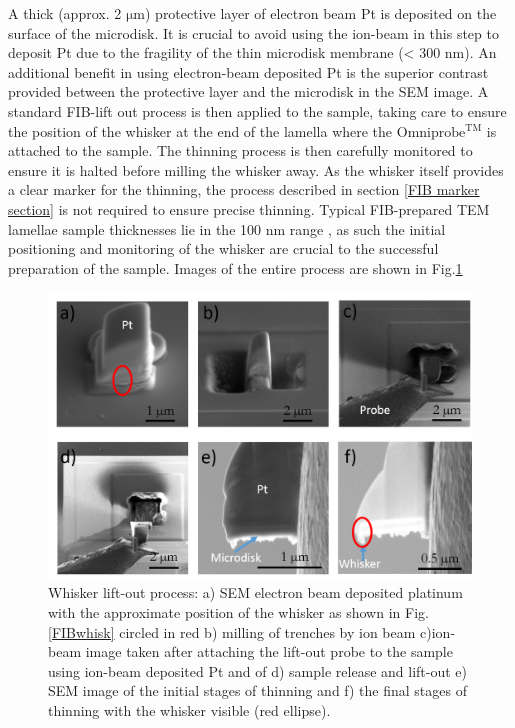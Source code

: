 A thick (approx. 2 $\mathrm{\mu m}$) protective layer of electron beam Pt is deposited on the surface of the microdisk. It is crucial to avoid using the ion-beam in this step to deposit Pt due to the fragility of the thin microdisk membrane (< 300 nm). An additional benefit in using electron-beam deposited Pt is the superior contrast provided between the protective layer and the microdisk in the SEM image. A standard FIB-lift out process is then applied to the sample, taking care to ensure the position of the whisker at the end of the lamella where the $\mathrm{Omniprobe^{TM}}$ is attached to the sample. The thinning process is then carefully monitored to ensure it is halted before milling the whisker away. As the whisker itself provides a clear marker for the thinning, the process described in section \ref{FIB marker section} is not required to ensure precise thinning. Typical FIB-prepared TEM lamellae sample thicknesses lie in the 100 nm range \cite{Bals2007}, as such the initial positioning and monitoring of the whisker are crucial to the successful preparation of the sample. Images of the entire process are shown in Fig.\ref{udiskliftout}

\begin{figure}[h]
	\centering
	\includegraphics[width=1\textwidth]{Figs/Ch4/udiskliftout}
	\caption {Whisker lift-out process: a) SEM electron beam deposited platinum with the approximate position of the whisker as shown in Fig. \ref{FIBwhisk} circled in red b) milling of trenches by ion beam c)ion-beam image taken after attaching the lift-out probe to the sample using ion-beam deposited Pt and of d) sample release and lift-out e)  SEM image of the initial stages of thinning and f) the final stages of thinning with the whisker visible (red ellipse).}
	\label{udiskliftout}
\end{figure}
\FloatBarrier 

